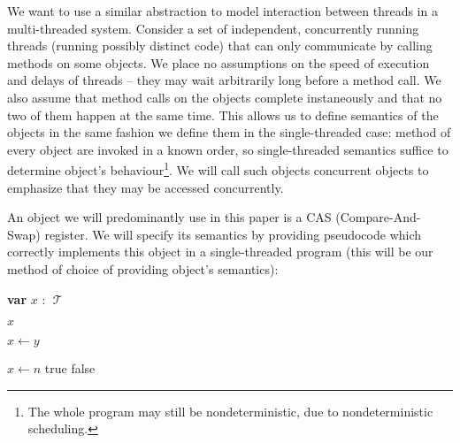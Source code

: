 \documentclass[a4paper,11pt]{article}
\def\T{\ensuremath{\operatorname{\mathcal{T}}}\text{ }}
\newcommand{\var}[2]{\textbf{var }#1 : #2}
\begin{document}
We want to use a similar abstraction to model interaction between threads in a multi-threaded system.
Consider a set of independent, concurrently running threads (running possibly
distinct code) that can only communicate by calling methods on some objects. We place no assumptions on
the speed of execution and delays of threads -- they may wait arbitrarily long before a method call.
We also assume that method calls on the objects complete instaneously and that no two of them happen at the same time.
This allows us to define semantics of the objects in the same fashion we define them in the single-threaded case:
method of every object are invoked in a known order, so single-threaded semantics suffice to determine object's behaviour\footnote{The whole program may still be nondeterministic, due to nondeterministic scheduling.}.
We will call such objects concurrent objects to emphasize that they may be accessed concurrently.




An object we will predominantly use in this paper is a CAS (Compare-And-Swap) register.
We will specify its semantics by providing pseudocode which correctly implements this object in
a single-threaded program (this will be our method of choice of providing object's semantics):

\begin{algorithmic}[1]
\State\var{$x$}{\T}
	
	\State\Return $x$
\EndFunction

	\State $x \gets y$
\EndFunction

	\State $x \gets n$
	\State\Return true
\Else
	\State\Return false
\EndIf
\EndFunction
\end{algorithmic}
\end{document}
